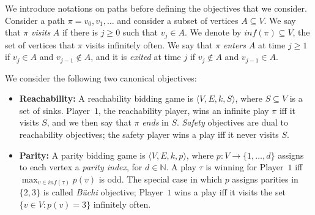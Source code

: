 \documentclass{article}\providecommand{\nequiv}{\not\equiv}\usepackage[a4paper,margin=20mm]{geometry}
\newcommand{\PO}{Player~$1$\xspace}
\newcommand{\Nat}{\mathbb{N}}
\newcommand{\zug}[1]{\langle #1  \rangle}
\renewcommand{\set}[1]{\{ #1  \}}
\begin{document}
We introduce notations on paths before defining the objectives that we consider. Consider a path $\pi = v_0,v_1,\ldots$ and consider a subset of vertices $A \subseteq V$. We say that $\pi$ {\em visits} $A$ if there is $j \geq 0$ such that $v_j \in A$. We denote by $inf(\pi) \subseteq V$, the set of vertices that $\pi$ visits infinitely often. 
We say that $\pi$ {\em enters} $A$ at time $j \geq 1$ if $v_j \in A$ and $v_{j-1} \notin A$, and it is {\em exited} at time $j$ if $v_j \notin A$ and $v_{j-1} \in A$. 

We consider the following two canonical objectives:
\begin{itemize}
\item {\bf Reachability:} A reachability bidding game is $\zug{V, E, k, S}$, where $S \subseteq V$ is a set of sinks. \PO, the reachability player, wins an infinite play $\pi$ iff it visits $S$, and we then say that $\pi$ {\em ends} in $S$. {\em Safety} objectives are dual to reachability objectives; the safety player wins a play iff it never visits $S$.  
\item {\bf Parity:}  A parity bidding game is $\zug{V, E, k, p}$, where $p: V \rightarrow \set{1,\ldots, d}$ assigns to each vertex a {\em parity index}, for $d \in \Nat$. A play $\tau$ is winning for \PO iff $\max_{v \in inf(\tau)} p(v)$ is odd. The special case in which $p$ assigns parities in $\set{2,3}$ is called {\em B\"uchi} objective;  \PO wins a play iff it visits the set $\set{v \in V: p(v) = 3}$ infinitely often. 
\end{itemize}
\end{document}
